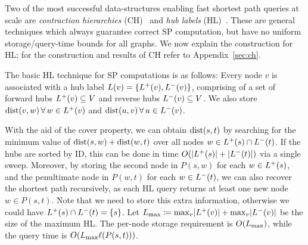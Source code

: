 Two of the most successful data-structures enabling fast shortest path queries at scale are \emph{contraction hierarchies} (CH)~\citep{geisberger_ch_definition} and \emph{hub labels} (HL)~\citep{cohen_definition_hl}.
These are general techniques which always guarantee correct SP computation, but have no uniform storage/query-time bounds for all graphs. 
We now explain the construction for HL; for the construction and results of CH refer to Appendix~\ref{sec:ch}.

The basic HL technique for SP computations is as follows:
Every node $v$ is associated with a hub label $L(v) = \crl*{\Lf(v),\Lb(v)}$, comprising of a set of forward hubs $\Lf(v)\subseteq V$ and reverse hubs $\Lb(v)\subseteq V$.
We also store $\dist(v,w) \,\forall\, w\in\Lf(v)$ and $\dist(u,v)\,\forall\,u\in\Lb(v)$.

With the aid of the cover property, we can obtain $\dist(s,t)$ by searching for the minimum value of $\dist(s,w)+\dist(w,t)$ over all nodes $w\in\Lf(s)\cap\Lb(t)$.
If the hubs are sorted by ID, this can be done in time $\Or(\card{\Lf(s)}+\card{\Lb(t)})$ via a single sweep.
Moreover, by storing the second node in $P(s,w)$ for each $w\in \Lf(s)$, and the penultimate node in $P(w,t)$ for each $w\in \Lb(t)$, we can also recover the shortest path recursively, as each HL query returns at least one new node $w\in P(s,t)$.
Note that we need to store this extra information, otherwise we could have $\Lf(s)\cap\Lb(t)=\crl{s}$.
Let $\Lm \defeq \max_v\abs*{\Lf(v)}+\max_v\abs*{\Lb(v)}$ be the size of the maximum HL.
The per-node storage requirement is $\Or(\Lm)$, while the query time is $\Or(\Lm\ell(P(s,t)))$.

